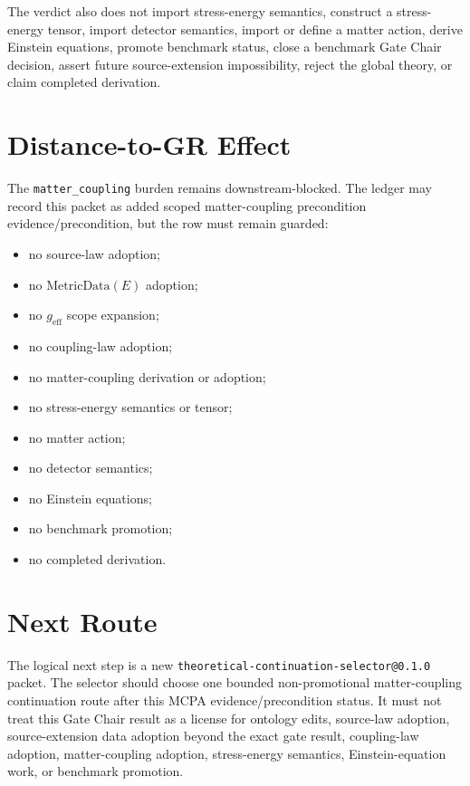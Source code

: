 \documentclass[11pt]{article}
\newcommand{\MetricData}{\mathrm{MetricData}}
\newcommand{\geff}{g_{\mathrm{eff}}}
\begin{document}
The verdict also does not import stress-energy semantics, construct a
stress-energy tensor, import detector semantics, import or define a matter
action, derive Einstein equations, promote benchmark status, close a benchmark
Gate Chair decision, assert future source-extension impossibility, reject the
global theory, or claim completed derivation.

\section{Distance-to-GR Effect}

The \texttt{matter\_coupling} burden remains downstream-blocked. The ledger may
record this packet as added scoped matter-coupling precondition
evidence/precondition, but the row must remain guarded:

\begin{itemize}
  \item no source-law adoption;
  \item no \(\MetricData(E)\) adoption;
  \item no \(\geff\) scope expansion;
  \item no coupling-law adoption;
  \item no matter-coupling derivation or adoption;
  \item no stress-energy semantics or tensor;
  \item no matter action;
  \item no detector semantics;
  \item no Einstein equations;
  \item no benchmark promotion;
  \item no completed derivation.
\end{itemize}

\section{Next Route}

The logical next step is a new \texttt{theoretical-continuation-selector@0.1.0}
packet. The selector should choose one bounded non-promotional
matter-coupling continuation route after this MCPA evidence/precondition
status. It must not treat this Gate Chair result as a license for ontology
edits, source-law adoption, source-extension data adoption beyond the exact
gate result, coupling-law adoption, matter-coupling adoption, stress-energy
semantics, Einstein-equation work, or benchmark promotion.
\end{document}

